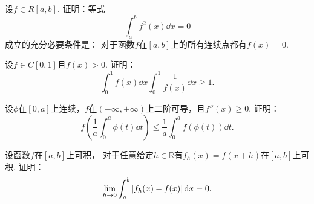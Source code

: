 \begin{example}
设\(f \in R[a,b]\).
证明：等式\[
	\int_a^b f^2(x) \dd{x} = 0
\]成立的充分必要条件是：
对于函数\(f\)在\([a,b]\)上的所有连续点都有\(f(x)=0\).
\end{example}

\begin{example}
设\(f \in C[0,1]\)且\(f(x)>0\).
证明：\[
	\int_0^1 f(x) \dd{x}
	\int_0^1 \frac1{f(x)} \dd{x}
	\geq 1.
\]
\end{example}

\begin{example}
设\(\phi\)在\([0,a]\)上连续，\(f\)在\((-\infty,+\infty)\)上二阶可导，且\(f''(x)\geq0\).
证明：\[
	f\left(\frac1a \int_0^a \phi(t) \dd{t}\right)
	\leq \frac1a \int_0^a f(\phi(t)) \dd{t}.
\]
\end{example}

\begin{example}
设函数\(f\)在\([a,b]\)上可积，
对于任意给定\(h\in\mathbb{R}\)有\(f_h(x) = f(x+h)\)在\([a,b]\)上可积.
证明：\[
	\lim_{h\to0} \int_a^b \abs{f_h(x)-f(x)} \dd{x} = 0.
\]
\end{example}
